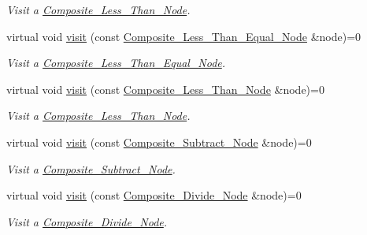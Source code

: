 \begin{DoxyCompactItemize}
\begin{DoxyCompactList}\small\item\em Visit a \hyperlink{classMadara_1_1Expression__Tree_1_1Composite__Less__Than__Node}{Composite\_\-Less\_\-Than\_\-Node}. \item\end{DoxyCompactList}\item 
virtual void \hyperlink{classMadara_1_1Expression__Tree_1_1Visitor_a61caff0eabd03b465eb29d2001bbadef}{visit} (const \hyperlink{classMadara_1_1Expression__Tree_1_1Composite__Less__Than__Equal__Node}{Composite\_\-Less\_\-Than\_\-Equal\_\-Node} \&node)=0
\begin{DoxyCompactList}\small\item\em Visit a \hyperlink{classMadara_1_1Expression__Tree_1_1Composite__Less__Than__Equal__Node}{Composite\_\-Less\_\-Than\_\-Equal\_\-Node}. \item\end{DoxyCompactList}\item 
virtual void \hyperlink{classMadara_1_1Expression__Tree_1_1Visitor_a88cd67af717a399e6e4837ec25add04e}{visit} (const \hyperlink{classMadara_1_1Expression__Tree_1_1Composite__Less__Than__Node}{Composite\_\-Less\_\-Than\_\-Node} \&node)=0
\begin{DoxyCompactList}\small\item\em Visit a \hyperlink{classMadara_1_1Expression__Tree_1_1Composite__Less__Than__Node}{Composite\_\-Less\_\-Than\_\-Node}. \item\end{DoxyCompactList}\item 
virtual void \hyperlink{classMadara_1_1Expression__Tree_1_1Visitor_a0a0e59098b9b084be172b8ee62dd9fd5}{visit} (const \hyperlink{classMadara_1_1Expression__Tree_1_1Composite__Subtract__Node}{Composite\_\-Subtract\_\-Node} \&node)=0
\begin{DoxyCompactList}\small\item\em Visit a \hyperlink{classMadara_1_1Expression__Tree_1_1Composite__Subtract__Node}{Composite\_\-Subtract\_\-Node}. \item\end{DoxyCompactList}\item 
virtual void \hyperlink{classMadara_1_1Expression__Tree_1_1Visitor_ad9ce73a2a45d3e6946215da2d08a5420}{visit} (const \hyperlink{classMadara_1_1Expression__Tree_1_1Composite__Divide__Node}{Composite\_\-Divide\_\-Node} \&node)=0
\begin{DoxyCompactList}\small\item\em Visit a \hyperlink{classMadara_1_1Expression__Tree_1_1Composite__Divide__Node}{Composite\_\-Divide\_\-Node}. \item\end{DoxyCompactList}\item 

\end{DoxyCompactItemize}
